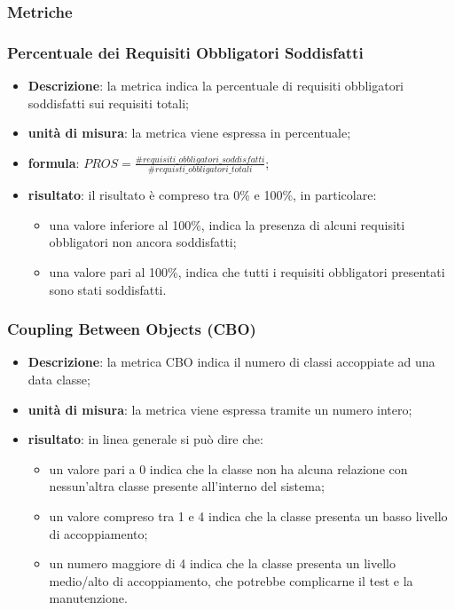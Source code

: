 \subsubsection{Metriche} 
	\subsubsection*{Percentuale dei Requisiti Obbligatori Soddisfatti}
		\begin{itemize}
			\item{\textbf{Descrizione}}: la metrica indica la percentuale di requisiti obbligatori soddisfatti sui requisiti totali; 
			\item{\textbf{unità di misura}}: la metrica viene espressa in percentuale; 
			\item{\textbf{formula}}: $ PROS = \displaystyle\frac{\#requisiti\_obbligatori\_soddisfatti}{\#requisti\_obbligatori\_totali}$; 
			\item{\textbf{risultato}}: il risultato è compreso tra 0\% e 100\%, in particolare: 
				\begin{itemize}
					\item una valore inferiore al 100\%, indica la presenza di alcuni requisiti obbligatori non ancora soddisfatti; 
					\item una valore pari al 100\%, indica che tutti i requisiti obbligatori presentati sono stati soddisfatti.  
				\end{itemize} 
		\end{itemize}

		\subsubsection*{Coupling Between Objects (CBO)}
		\begin{itemize}
			\item{\textbf{Descrizione}}: la metrica CBO indica il numero di classi accoppiate ad una data classe; 
			\item{\textbf{unità di misura}}: la metrica viene espressa tramite un numero intero;  
			\item{\textbf{risultato}}: in linea generale si può dire che: 
			\begin{itemize}
				\item un valore pari a 0 indica che la classe non ha alcuna relazione con nessun'altra classe presente all'interno del sistema; 
				\item un valore compreso tra 1 e 4 indica che la classe presenta un basso livello di accoppiamento; 
				\item un numero maggiore di 4 indica che la classe presenta un livello medio/alto di accoppiamento, che potrebbe complicarne il test e la manutenzione. 
			\end{itemize}
		\end{itemize}
	

